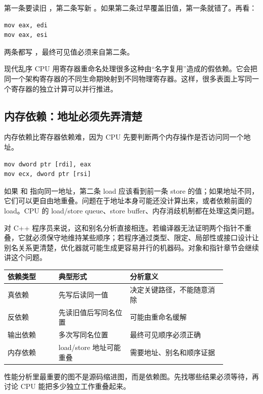 第一条要读旧 ，第二条写新 。如果第二条过早覆盖旧值，第一条就错了。再看：

\begin{lstlisting}
mov eax, edi
mov eax, esi
\end{lstlisting}

两条都写 ，最终可见值必须来自第二条。

现代乱序 CPU 用寄存器重命名处理很多这种由“名字复用”造成的假依赖。它会把同一个架构寄存器的不同生命期映射到不同物理寄存器。这样，很多表面上写同一个寄存器的独立计算可以并行推进。

\subsection{内存依赖：地址必须先弄清楚}

内存依赖比寄存器依赖难，因为 CPU 先要判断两个内存操作是否访问同一个地址。

\begin{lstlisting}
mov dword ptr [rdi], eax
mov ecx, dword ptr [rsi]
\end{lstlisting}

如果  和  指向同一地址，第二条 load 应该看到前一条 store 的值；如果地址不同，它们可以更自由地重叠。问题在于地址本身可能还没计算出来，或者依赖前面的 load。CPU 的 load/store queue、store buffer、内存消歧机制都在处理这类问题。

对 C++ 程序员来说，这和别名分析直接相连。若编译器无法证明两个指针不重叠，它就必须保守地维持某些顺序；若程序通过类型、限定、局部性或接口设计让别名关系更清楚，优化器就可能生成更容易并行的机器码。对象和指针章节会继续讲这个问题。

\begin{center}
\begin{tabular}{p{0.20\linewidth}p{0.28\linewidth}p{0.38\linewidth}}
\toprule
依赖类型 & 典型形式 & 分析意义 \\
\midrule
真依赖 & 先写后读同一值 & 决定关键路径，不能随意消除 \\
反依赖 & 先读旧值后写同名位置 & 可能由重命名缓解 \\
输出依赖 & 多次写同名位置 & 最终可见顺序必须正确 \\
内存依赖 & load/store 地址可能重叠 & 需要地址、别名和顺序证据 \\
\bottomrule
\end{tabular}
\end{center}

\begin{mentalmodel}
性能分析里最重要的图不是源码缩进图，而是依赖图。先找哪些结果必须等待，再讨论 CPU 能把多少独立工作重叠起来。
\end{mentalmodel}

